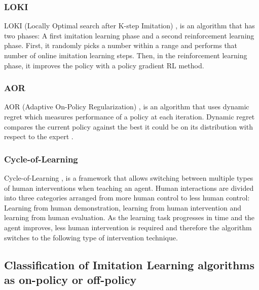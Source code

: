 \subsubsection*{LOKI}
LOKI (Locally Optimal search after K-step Imitation) \cite{LOKI-Cheng:2018}, is an algorithm that has two phases: A first imitation learning phase and a second reinforcement learning phase. First, it randomly picks a number within a range and performs that number of online imitation learning steps. Then, in the reinforcement learning phase, it improves the policy with a policy gradient RL method.










\subsubsection*{AOR}
AOR (Adaptive On-Policy Regularization) \cite{AOR-lee-laskey:2019}, is an algorithm that uses dynamic regret which measures performance of a policy at each iteration. Dynamic regret compares the current  policy  against  the  best  it  could  be  on  its  distribution with  respect  to  the  expert \cite{Dynamic-regret-Laskey:2018}.  

















\subsubsection*{Cycle-of-Learning}
Cycle-of-Learning \cite{Cycle-of-Learning-waytowich:2018},  is a framework that allows switching between multiple types of human interventions when teaching an agent. Human interactions are divided into three categories arranged from more human control to less human control: Learning from human demonstration, learning from human intervention and learning from human evaluation. As the learning task progresses in time and the agent improves, less human intervention is required and therefore the algorithm switches to the following type of intervention technique.


\subsection{Classification of Imitation Learning algorithms as on-policy or off-policy}

